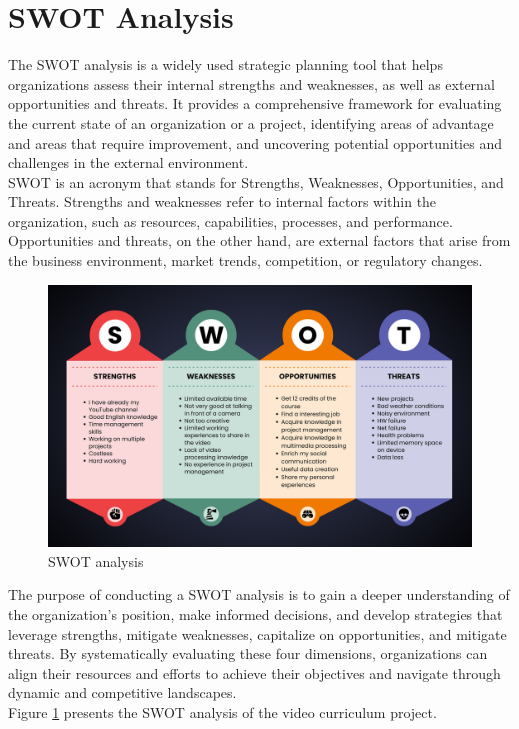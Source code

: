 \documentclass[eng]{class}
\begin{document}
\section{SWOT Analysis}
The SWOT analysis is a widely used strategic planning tool that helps organizations assess their internal strengths and weaknesses,
as well as external opportunities and threats. It provides a comprehensive framework for evaluating the current state of an organization or a project,
identifying areas of advantage and areas that require improvement, and uncovering potential opportunities and challenges in the external environment.\\
SWOT is an acronym that stands for Strengths, Weaknesses, Opportunities, and Threats. Strengths and weaknesses refer to internal factors within the organization,
such as resources, capabilities, processes, and performance.
\clearpage
\noindent
Opportunities and threats, on the other hand, are external factors that arise from the
business environment, market trends,
competition, or regulatory changes.
\begin{figure}[t!]
  \centering
  \includegraphics[width=\textwidth]{images/SWOT.png}
  \caption{SWOT analysis}
  \label{fig-3}
\end{figure}
\noindent
The purpose of conducting a SWOT analysis is to gain a deeper understanding of the organization's position,
make informed decisions, and develop strategies that leverage strengths, mitigate weaknesses, capitalize on opportunities,
and mitigate threats. By systematically evaluating these four dimensions, organizations can align their resources and efforts to achieve their
objectives and navigate through dynamic and competitive landscapes.\\
Figure \ref{fig-3} presents the SWOT analysis of the video curriculum project.
\end{document}
